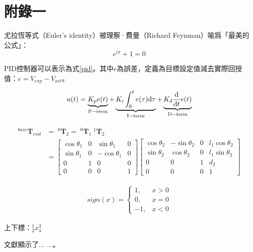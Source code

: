 \clearpage
\appendix
\chapter{附錄一}
\label{appendix}

尤拉恆等式（Euler's identity）被理察·費曼（Richard Feynman）喻爲「最美的公式」：
\begin{equation}
    e^{i \pi} + 1 = 0 \label{euler-identity}
\end{equation}

\vspace{2cm}

PID控制器可以表示為式\eqref{pid}。其中$e$為誤差，定義為目標設定值減去實際回授值：$e=V_{exp}-V_{act}$。

\begin{equation}
    u(t) = \underbrace{K_p e(t)}_{\rm P-term}
         + \underbrace{K_i \int_{0}^{t} e(\tau)\mathrm{d}\tau}_{\rm I-term}
         + \underbrace{K_d \frac{\mathrm{d}}{\mathrm{d}t} e(t)}_{\rm D-term}
    \label{pid}
\end{equation}

\vspace{2cm}

\begin{align}
^{base}\mathbf{T}_{end} &= \; ^0\mathbf{T}_2 = \; ^0\mathbf{T}_1 \; ^1\mathbf{T}_2 \\
&=
\begin{bmatrix}
\cos \theta_1&0&\sin \theta_1&0\\
\sin \theta_1&0&-\cos \theta_1&0\\
0&1&0&0\\
0&0&0&1
\end{bmatrix}
\begin{bmatrix}
\cos \theta_2&-\sin \theta_2&0&l_1\cos \theta_2\\
\sin \theta_2&\cos \theta_2&0&l_1\sin \theta_2\\
0&0&1&d_2\\
0&0&0&1
\end{bmatrix}
\end{align}

\begin{align}
sign(x) =
\left\{
    \begin{array}{rl}
    1, & x>0 \\
    0, & x=0 \\
    -1, & x<0
    \end{array}
\right.
\end{align}

上下標：$^1_2x^3_4$

文獻\cite{theHumanCondition}顯示了... ...。
